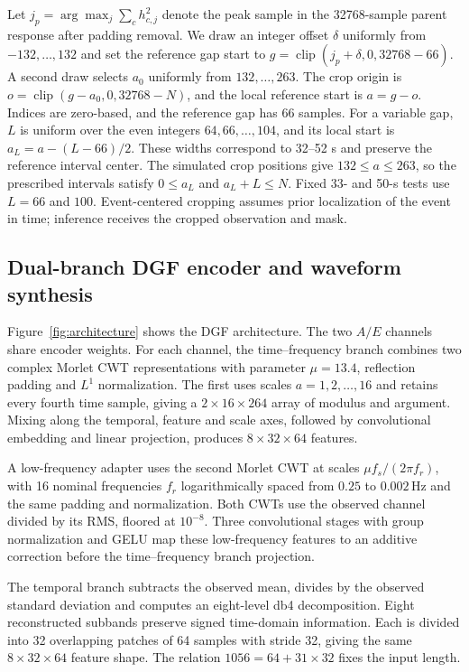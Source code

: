 \documentclass[10pt,prd,aps,a4paper,twocolumn,superscriptaddress,nofootinbib,floatfix]{revtex4-2}
\begin{document}
Let $j_p=\arg\max_j\sum_ch_{c,j}^2$ denote the peak sample in the 32768-sample parent response after padding removal. We draw an integer offset $\delta$ uniformly from $-132,\ldots,132$ and set the reference gap start to $g=\operatorname{clip}(j_p+\delta,0,32768-66)$. A second draw selects $a_0$ uniformly from $132,\ldots,263$. The crop origin is $o=\operatorname{clip}(g-a_0,0,32768-N)$, and the local reference start is $a=g-o$. Indices are zero-based, and the reference gap has 66 samples. For a variable gap, $L$ is uniform over the even integers $64,66,\ldots,104$, and its local start is $a_L=a-(L-66)/2$. These widths correspond to 32--52 s and preserve the reference interval center. The simulated crop positions give $132\le a\le263$, so the prescribed intervals satisfy $0\le a_L$ and $a_L+L\le N$. Fixed 33- and 50-s tests use $L=66$ and $100$. Event-centered cropping assumes prior localization of the event in time; inference receives the cropped observation and mask.

\subsection{Dual-branch DGF encoder and waveform synthesis}\label{sec:architecture}
Figure~\ref{fig:architecture} shows the DGF architecture. The two $A/E$ channels share encoder weights. For each channel, the time--frequency branch combines two complex Morlet CWT representations with parameter $\mu=13.4$, reflection padding and $L^1$ normalization. The first uses scales $a=1,2,\ldots,16$ and retains every fourth time sample, giving a $2\times16\times264$ array of modulus and argument. Mixing along the temporal, feature and scale axes, followed by convolutional embedding and linear projection, produces $8\times32\times64$ features.

A low-frequency adapter uses the second Morlet CWT at scales $\mu f_s/(2\pi f_r)$, with 16 nominal frequencies $f_r$ logarithmically spaced from $0.25$ to $0.002\,\mathrm{Hz}$ and the same padding and normalization. Both CWTs use the observed channel divided by its RMS, floored at $10^{-8}$. Three convolutional stages with group normalization and GELU map these low-frequency features to an additive correction before the time--frequency branch projection.

The temporal branch subtracts the observed mean, divides by the observed standard deviation and computes an eight-level db4 decomposition. Eight reconstructed subbands preserve signed time-domain information. Each is divided into 32 overlapping patches of 64 samples with stride 32, giving the same $8\times32\times64$ feature shape. The relation $1056=64+31\times32$ fixes the input length.
\end{document}
